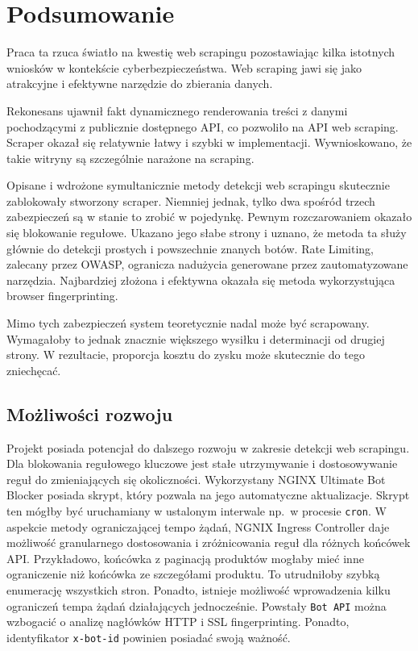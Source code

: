 \newpage


\section{Podsumowanie}\label{sec:podsumowanie}

Praca ta rzuca światło na kwestię web scrapingu pozostawiając kilka istotnych wniosków w kontekście cyberbezpieczeństwa.
Web scraping jawi się jako atrakcyjne i efektywne narzędzie do zbierania danych.

Rekonesans ujawnił fakt dynamicznego renderowania treści z danymi pochodzącymi z publicznie dostępnego API\@, co pozwoliło na API web scraping.
Scraper okazał się relatywnie łatwy i szybki w implementacji.
Wywnioskowano, że takie witryny są szczególnie narażone na scraping.

Opisane i wdrożone symultanicznie metody detekcji web scrapingu skutecznie zablokowały stworzony scraper.
Niemniej jednak, tylko dwa spośród trzech zabezpieczeń są w stanie to zrobić w pojedynkę.
Pewnym rozczarowaniem okazało się blokowanie regułowe.
Ukazano jego słabe strony i uznano, że metoda ta służy głównie do detekcji prostych i powszechnie znanych botów.
Rate Limiting, zalecany przez OWASP, ogranicza nadużycia generowane przez zautomatyzowane narzędzia.
Najbardziej złożona i efektywna okazała się metoda wykorzystująca browser fingerprinting.

Mimo tych zabezpieczeń system teoretycznie nadal może być scrapowany.
Wymagałoby to jednak znacznie większego wysiłku i determinacji od drugiej strony.
W rezultacie, proporcja kosztu do zysku może skutecznie do tego zniechęcać.

\subsection{Możliwości rozwoju}\label{subsec:mozliwosci-rozwoju}

Projekt posiada potencjał do dalszego rozwoju w zakresie detekcji web scrapingu.
Dla blokowania regułowego kluczowe jest stałe utrzymywanie i dostosowywanie reguł do zmieniających się okoliczności.
Wykorzystany NGINX Ultimate Bot Blocker posiada skrypt, który pozwala na jego automatyczne aktualizacje.
Skrypt ten mógłby być uruchamiany w ustalonym interwale np.~w procesie \texttt{cron}.
W aspekcie metody ograniczającej tempo żądań, NGNIX Ingress Controller daje możliwość granularnego dostosowania i zróżnicowania reguł dla różnych końcówek API\@.
Przykładowo, końcówka z paginacją produktów mogłaby mieć inne ograniczenie niż końcówka ze szczegółami produktu.
To utrudniłoby szybką enumerację wszystkich stron.
Ponadto, istnieje możliwość wprowadzenia kilku ograniczeń tempa żądań działających jednocześnie.
Powstały \texttt{Bot API} można wzbogacić o analizę nagłówków HTTP i SSL fingerprinting.
Ponadto, identyfikator \texttt{x-bot-id} powinien posiadać swoją ważność.